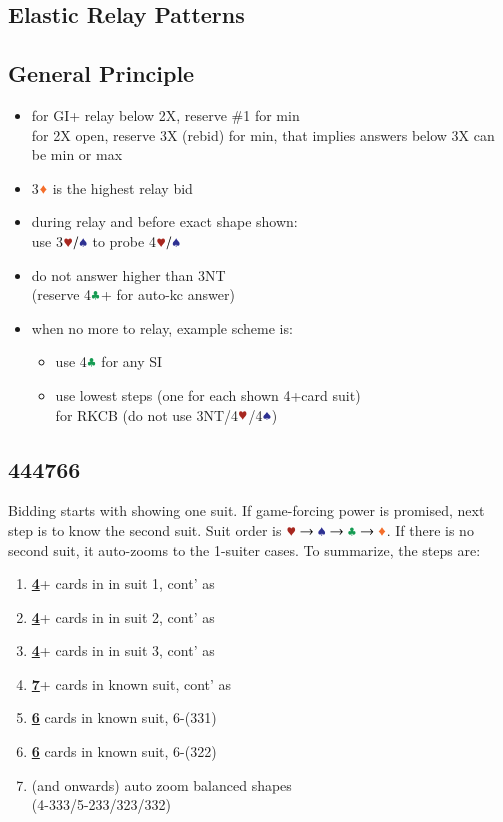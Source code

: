 \documentclass{article}
\begin{document}
\begin{multicols}{2}
\begin{CJK*}{UTF8}{gt}
\section{Elastic Relay Patterns}

\subsection{General Principle}
\begin{itemize}
    \item for GI+ relay below 2X, reserve \#1 for min \\
        for 2X open, reserve 3X (rebid) for min,
        that implies answers below 3X can be min or max
    \item 3$\ddd$ is the highest relay bid
    \item during relay and before exact shape shown: \\
        use 3$\hhh/\sss$ to probe 4$\hhh/\sss$
    \item do not answer higher than 3NT \\
        (reserve 4$\ccc$+ for auto-kc answer)
    \item when no more to relay, example scheme is:
    \begin{itemize}
        \item use 4$\ccc$ for any SI
        \item use lowest steps (one for each shown 4+card suit) \\
            for RKCB (do not use 3NT/4$\hhh$/4$\sss$)
    \end{itemize}
\end{itemize}

\subsection{444766}\label{sec:444766}
Bidding starts with showing one suit. If game-forcing power is promised, next step is to know the second suit.
Suit order is $\hscd$. If there is no second suit, it auto-zooms to the 1-suiter cases. To summarize, the steps are:

\begin{enumerate}
    \item \textbf{\underline{4}}+ cards in in suit 1, cont' as 
    \item \textbf{\underline{4}}+ cards in in suit 2, cont' as
    \item \textbf{\underline{4}}+ cards in in suit 3, cont' as
    \item \textbf{\underline{7}}+ cards in known suit, cont' as
    \item \textbf{\underline{6}} cards in known suit, 6-(331)
    \item \textbf{\underline{6}} cards in known suit, 6-(322)
    \item (and onwards) auto zoom balanced shapes \\
        (4-333/5-233/323/332)
\end{enumerate}


\end{CJK*}
\end{multicols}
\end{document}
